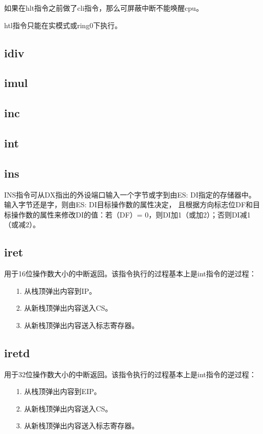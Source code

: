 \documentclass[a4paper,left=2.5cm,right=2.5cm,11pt]{article}
\begin{document}
	如果在hlt指令之前做了cli指令，那么可屏蔽中断不能唤醒cpu。\par

	htl指令只能在实模式或ring0下执行。

\subsection{idiv}
\subsection{imul}
\subsection{inc}
\subsection{int}
\subsection{ins}
	INS指令可从DX指出的外设端口输入一个字节或字到由ES: DI指定的存储器中。 
	输入字节还是字，则由ES: DI目标操作数的属性决定，
	且根据方向标志位DF和目标操作数的属性来修改DI的值：若（DF）= 0，则DI加1（或加2）；否则DI减1（或减2）。 

\subsection{iret}
	用于16位操作数大小的中断返回。该指令执行的过程基本上是int指令的逆过程：
	\begin{itemize}
		\item[1.] 从栈顶弹出内容到IP。
		\item[2.] 从新栈顶弹出内容送入CS。
		\item[3.] 从新栈顶弹出内容送入标志寄存器。
	\end{itemize}

\subsection{iretd}
	用于32位操作数大小的中断返回。该指令执行的过程基本上是int指令的逆过程：
	\begin{itemize}
		\item[1.] 从栈顶弹出内容到EIP。
		\item[2.] 从新栈顶弹出内容送入CS。
		\item[3.] 从新栈顶弹出内容送入标志寄存器。
	\end{itemize}
\end{document}
